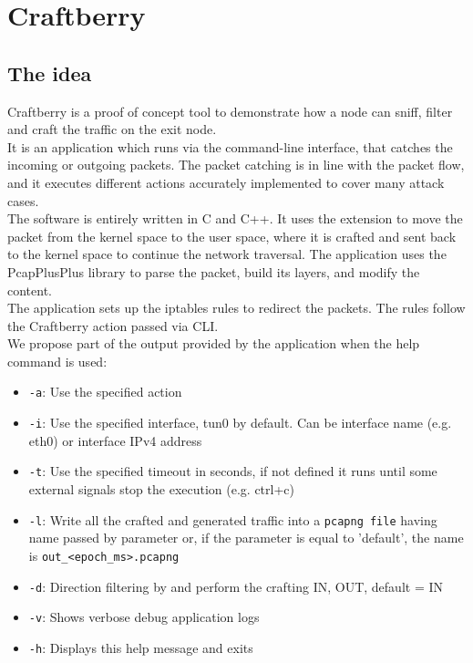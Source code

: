 \documentclass[12pt]{article}
\begin{document}
	\section{Craftberry}

	\subsection{The idea}
	Craftberry is a proof of concept tool to demonstrate how a node can sniff, filter and craft the traffic on the exit node.\\
	It is an application which runs via the command-line interface, that catches the incoming or outgoing packets. The packet catching is in line with the packet flow, and it executes different actions accurately implemented to cover many attack cases.\\
	The software is entirely written in C and C++. It uses the  extension to move the packet from the kernel space to the user space, where it is crafted and sent back to the kernel space to continue the network traversal. The application uses the PcapPlusPlus library to parse the packet, build its layers, and modify the content.\\
	The application sets up the iptables rules to redirect the packets. The rules follow the Craftberry action passed via CLI.\\
	
	We propose part of the output provided by the application when the help command is used:
	\begin{itemize}
		\item \lstinline{-a}: Use the specified action
		\item  \lstinline{-i}: Use the specified interface, tun0 by default. Can be interface name (e.g. eth0) or interface IPv4 address
		\item  \lstinline{-t}: Use the specified timeout in seconds, if not defined it runs until some external signals stop the execution (e.g. ctrl+c)
		\item  \lstinline{-l}: Write all the crafted and generated traffic into a \lstinline{pcapng file} having name passed by parameter or, if the parameter is equal to 'default', the name is \lstinline{out_<epoch_ms>.pcapng}
		\item  \lstinline{-d}: Direction filtering by and perform the crafting {IN, OUT}, default = IN
		\item  \lstinline{-v}: Shows verbose debug application logs
		\item  \lstinline{-h}: Displays this help message and exits
	\end{itemize}
		
\end{document}
